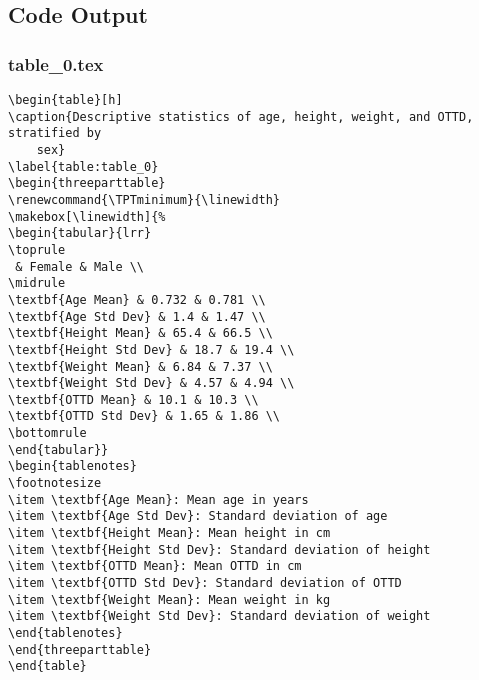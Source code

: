 \documentclass[11pt]{article}
\begin{document}
\subsection{Code Output}

\subsubsection*{table\_0.tex}

\begin{Verbatim}[tabsize=4]
\begin{table}[h]
\caption{Descriptive statistics of age, height, weight, and OTTD, stratified by
	sex}
\label{table:table_0}
\begin{threeparttable}
\renewcommand{\TPTminimum}{\linewidth}
\makebox[\linewidth]{%
\begin{tabular}{lrr}
\toprule
 & Female & Male \\
\midrule
\textbf{Age Mean} & 0.732 & 0.781 \\
\textbf{Age Std Dev} & 1.4 & 1.47 \\
\textbf{Height Mean} & 65.4 & 66.5 \\
\textbf{Height Std Dev} & 18.7 & 19.4 \\
\textbf{Weight Mean} & 6.84 & 7.37 \\
\textbf{Weight Std Dev} & 4.57 & 4.94 \\
\textbf{OTTD Mean} & 10.1 & 10.3 \\
\textbf{OTTD Std Dev} & 1.65 & 1.86 \\
\bottomrule
\end{tabular}}
\begin{tablenotes}
\footnotesize
\item \textbf{Age Mean}: Mean age in years
\item \textbf{Age Std Dev}: Standard deviation of age
\item \textbf{Height Mean}: Mean height in cm
\item \textbf{Height Std Dev}: Standard deviation of height
\item \textbf{OTTD Mean}: Mean OTTD in cm
\item \textbf{OTTD Std Dev}: Standard deviation of OTTD
\item \textbf{Weight Mean}: Mean weight in kg
\item \textbf{Weight Std Dev}: Standard deviation of weight
\end{tablenotes}
\end{threeparttable}
\end{table}

\end{Verbatim}
\end{document}

